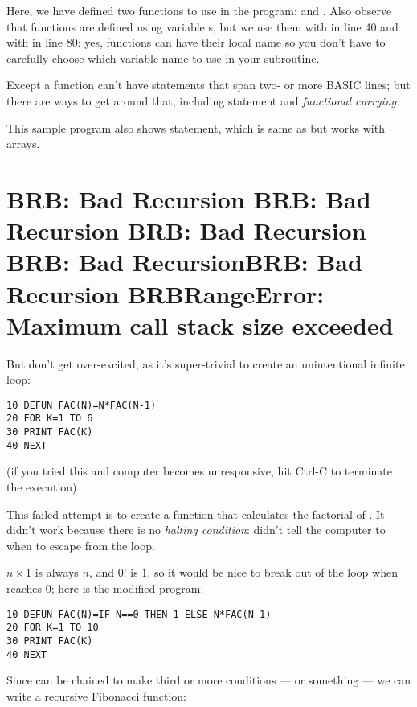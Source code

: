 Here, we have defined two functions to use in the program:  and . Also observe that functions are defined using variable s, but we use them with  in line 40 and with  in line 80: yes, functions can have their local name so you don't have to carefully choose which variable name to use in your subroutine.

\setcounter{curryingappearance}{\value{page}}
Except a function can't have statements that span two- or more BASIC lines; but there are ways to get around that, including  statement and \emph{functional currying.}

This sample program also shows  statement, which is same as  but works with arrays.

\section[Recursion]{BRB: Bad Recursion BRB: Bad Recursion BRB: Bad Recursion BRB: Bad RecursionBRB: Bad Recursion BRBRangeError: Maximum call stack size exceeded}

But don't get over-excited, as it's super-trivial to create an unintentional infinite loop:

\begin{lstlisting}
10 DEFUN FAC(N)=N*FAC(N-1)
20 FOR K=1 TO 6
30 PRINT FAC(K)
40 NEXT
\end{lstlisting}

(if you tried this and computer becomes unresponsive, hit Ctrl-C to terminate the execution)

This failed attempt is to create a function that calculates the factorial of . It didn't work because there is no \emph{halting condition}: didn't tell the computer to when to escape from the loop.

$n \times 1$ is always $n$, and $0!$ is $1$, so it would be nice to break out of the loop when  reaches $0$; here is the modified program:

\begin{lstlisting}
10 DEFUN FAC(N)=IF N==0 THEN 1 ELSE N*FAC(N-1)
20 FOR K=1 TO 10
30 PRINT FAC(K)
40 NEXT
\end{lstlisting}

Since  can be chained to make third or more conditions ---  or something --- we can write a recursive Fibonacci function:

